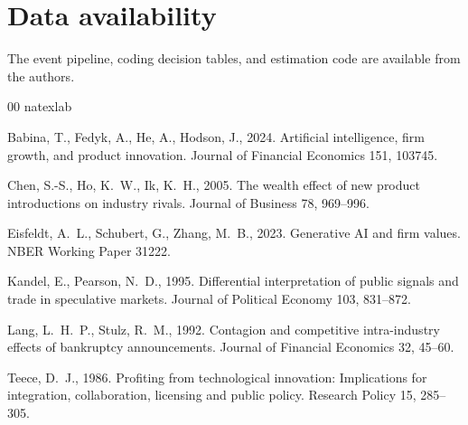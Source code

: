 \documentclass[review,12pt,authoryear]{elsarticle}
\begin{document}
\section*{Data availability}
The event pipeline, coding decision tables, and estimation code are
available from the authors.

\begin{thebibliography}{00}
\expandafter\ifx\csname natexlab\endcsname\relax\def\natexlab#1{#1}\fi

Babina, T., Fedyk, A., He, A., Hodson, J., 2024. Artificial intelligence,
firm growth, and product innovation. Journal of Financial Economics 151,
103745.

Chen, S.-S., Ho, K.~W., Ik, K.~H., 2005. The wealth effect of new product
introductions on industry rivals. Journal of Business 78, 969--996.

Eisfeldt, A.~L., Schubert, G., Zhang, M.~B., 2023. Generative AI and firm
values. NBER Working Paper 31222.

Kandel, E., Pearson, N.~D., 1995. Differential interpretation of public
signals and trade in speculative markets. Journal of Political Economy 103,
831--872.

Lang, L.~H.~P., Stulz, R.~M., 1992. Contagion and competitive intra-industry
effects of bankruptcy announcements. Journal of Financial Economics 32,
45--60.

Teece, D.~J., 1986. Profiting from technological innovation: Implications
for integration, collaboration, licensing and public policy. Research Policy
15, 285--305.

\end{thebibliography}
\end{document}

